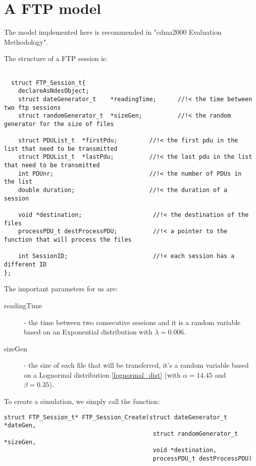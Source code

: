 \section{A FTP model}

The model implemented here is recommended in "cdma2000 Evaluation Methodology".

The structure of a FTP session is:
\begin{verbatim}

  struct FTP_Session_t{
    declareAsNdesObject;
    struct dateGenerator_t    *readingTime;      //!< the time between two ftp sessions
    struct randomGenerator_t  *sizeGen;          //!< the random generator for the size of files

    struct PDUList_t  *firstPdu;         //!< the first pdu in the list that need to be transmitted
    struct PDUList_t  *lastPdu;          //!< the last pdu in the list that need to be transmitted
    int PDUnr;                           //!< the number of PDUs in the list
    double duration;                     //!< the duration of a session

    void *destination;                    //!< the destination of the files
    processPDU_t destProcessPDU;          //!< a pointer to the function that will process the files

    int SessionID;                        //!< each session has a different ID
};

\end{verbatim}

The important parameters for us are:
\begin{description}
\item[readingTime] - the time between two consecutive sessions and it is a random variable
based on an Exponential distribution with $\lambda=0.006$.
\item[sizeGen] - the size of each file that will be transferred, it's a random variable based on a Lognormal distribution \ref{lognormal_dist} (with $\alpha=14.45$ and $\beta=0.35$).
\end{description}


To create a simulation, we simply call the function:
\begin{verbatim}
struct FTP_Session_t* FTP_Session_Create(struct dateGenerator_t *dateGen,
                                          struct randomGenerator_t *sizeGen,
                                          void *destination,
                                          processPDU_t destProcessPDU)
\end{verbatim}

